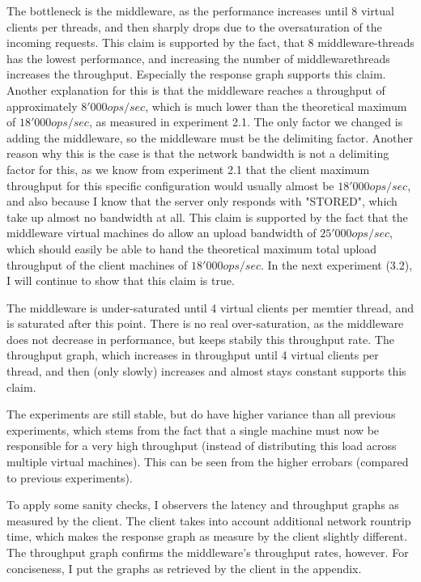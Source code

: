 \documentclass[11pt,a4paper]{article}
\begin{document}
The bottleneck is the middleware, as the performance increases until 8 virtual clients per threads, and then sharply drops due to the oversaturation of the incoming requests.
This claim is supported by the fact, that 8 middleware-threads has the lowest performance, and increasing the number of middlewarethreads increases the throughput.
Especially the response graph supports this claim.
Another explanation for this is that the middleware reaches a throughput of approximately $8'000 ops/sec$, which is much lower than the theoretical maximum of $18'000 ops/sec$, as measured in experiment 2.1.
The only factor we changed is adding the middleware, so the middleware must be the delimiting factor.
Another reason why this is the case is that the network bandwidth is not a delimiting factor for this, as we know from experiment 2.1 that the client maximum throughput for this specific configuration would usually almost be $18'000 ops/sec$, and also because I know that the server only responds with "STORED", which take up almost no bandwidth at all.
This claim is supported by the fact that the middleware virtual machines do allow an upload bandwidth of $25'000 ops / sec$, which should easily be able to hand the theoretical maximum total upload throughput of the client machines of $18'000 ops/sec$.
In the next experiment (3.2), I will continue to show that this claim is true.

The middleware is under-saturated until 4 virtual clients per memtier thread, and is saturated after this point.
There is no real over-saturation, as the middleware does not decrease in performance, but keeps stabily this throughput rate.
The throughput graph, which increases in throughput until 4 virtual clients per thread, and then (only slowly) increases and almost stays constant supports this claim.

The experiments are still stable, but do have higher variance than all previous experiments, which stems from the fact that a single machine must now be responsible for a very high throughput (instead of distributing this load across multiple virtual machines).
This can be seen from the higher errobars (compared to previous experiments).

To apply some sanity checks, I observers the latency and throughput graphs as measured by the client. 
The client takes into account additional network rountrip time, which makes the response graph as measure by the client slightly different.
The throughput graph confirms the middleware's throughput rates, however.
For conciseness, I put the graphs as retrieved by the client in the appendix.
\end{document}
